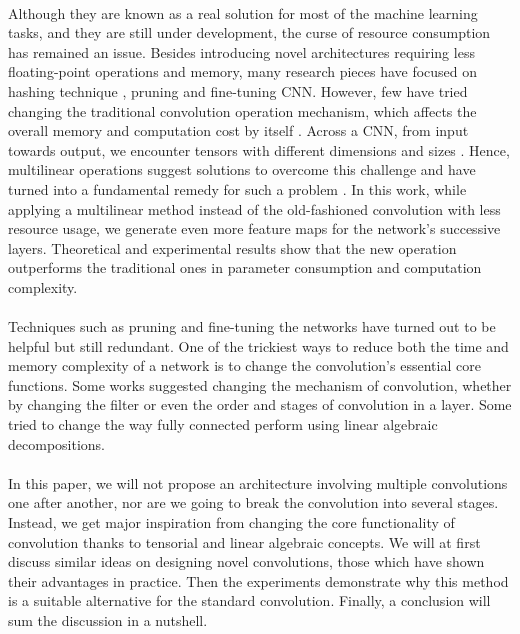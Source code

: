 \documentclass{report}
\begin{document}
\paragraph*{}
 Although they are known as a real solution for most of the machine learning tasks, and they are still under development, the curse of resource consumption has remained an issue. Besides introducing novel architectures requiring less floating-point operations and memory, many research pieces have focused on hashing technique
\cite{hashteq}
, pruning 
\cite{prun}
and fine-tuning
\cite{fine}
CNN. However, few have tried changing the traditional convolution operation mechanism, which affects the overall memory and computation cost by itself
\cite{convop1,
	convop2,
	convop3,
	convop4,convop5}. Across a CNN, from input towards output, we encounter tensors with different dimensions and sizes
\cite{tenmatvec}
. Hence, multilinear operations suggest solutions to overcome this challenge and have turned into a fundamental remedy for such a problem
\cite{convop1,trl}
.
In this work, while applying a multilinear method instead of the old-fashioned convolution with less resource usage, we generate even more feature maps for the network's successive layers. Theoretical and experimental results show that the new operation outperforms the traditional ones in parameter consumption and computation complexity.


\paragraph*{}
Techniques such as pruning and fine-tuning the networks have turned out to be helpful but still redundant\cite{redundancy}. One of the trickiest ways to reduce both the time and memory complexity of a network is to change the convolution's essential core functions. Some works suggested changing the mechanism of convolution, whether by changing the filter\cite{convop1,
	convop2,
	convop3,
	convop4,convop5,danish} or even the order and stages of convolution in a layer\cite{depthwise,mobilenets}. Some tried to change the way fully connected perform using linear algebraic decompositions\cite{trl}.

\paragraph*{}
In this paper, we will not propose an architecture involving multiple convolutions one after another\cite{resnets,alexnet,mobilenets,vgg}, nor are we going to break the convolution into several stages\cite{depthwise}. Instead, we get major inspiration from changing the core functionality of convolution thanks to tensorial and linear algebraic concepts\cite{convop1}. We will at first discuss similar ideas on designing novel convolutions, those which have shown their advantages in practice. Then the experiments demonstrate why this method is a suitable alternative for the standard convolution. Finally, a conclusion will sum the discussion in a nutshell.
\end{document}
